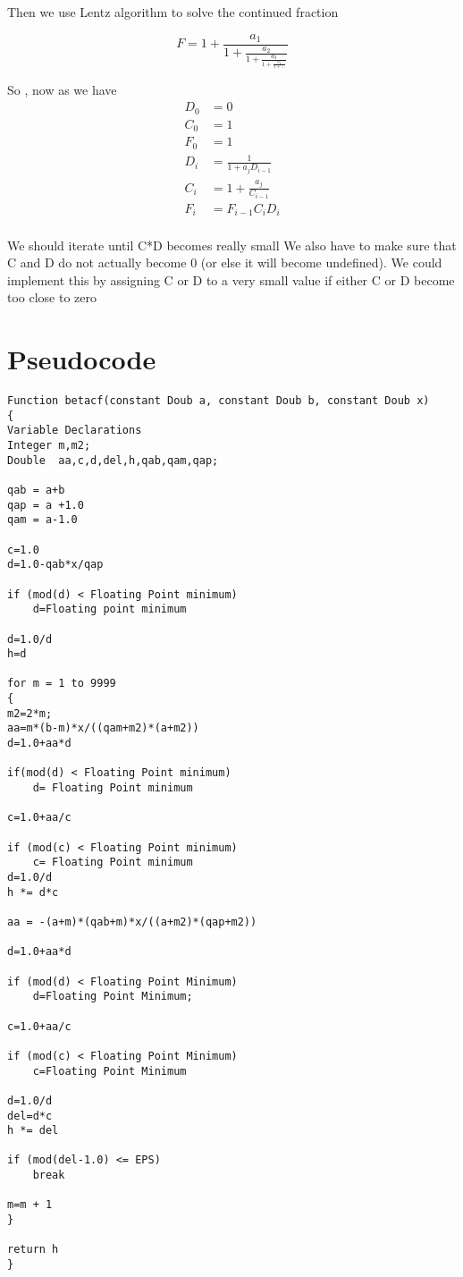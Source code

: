 \documentclass[12pt,letterpaper]{article}
\begin{document}
Then we use Lentz algorithm to solve the continued fraction


$$F = 1+\frac{a_1}{1+\frac{a_2}{1+\frac{a_3}{1+\frac{a_4}{1+...}}}}$$


So , now as we have
\begin{align*}

D_0 &= 0 \\
C_0 &= 1 \\
F_0 &= 1 \\

D_i &= \frac{1}{1 + a_j D_{i-1}} \\
C_i &= 1 + \frac{a_j}{C_{i-1}} \\
F_i &= F_{i-1} C_i D_i \\

\end{align*}

We should iterate until C*D becomes really small
We also have to make sure that C and D do not actually become 0 (or else it will become undefined). We could implement this by assigning C or D to a very small value if either C or D become too close to zero

\section*{Pseudocode}

     \begin{lstlisting}[style = C]
Function betacf(constant Doub a, constant Doub b, constant Doub x) 
{
Variable Declarations
Integer m,m2;
Double  aa,c,d,del,h,qab,qam,qap;

qab = a+b
qap = a +1.0
qam = a-1.0

c=1.0 
d=1.0-qab*x/qap

if (mod(d) < Floating Point minimum) 
    d=Floating point minimum

d=1.0/d
h=d

for m = 1 to 9999 
{
m2=2*m;
aa=m*(b-m)*x/((qam+m2)*(a+m2))
d=1.0+aa*d

if(mod(d) < Floating Point minimum) 
    d= Floating Point minimum 

c=1.0+aa/c

if (mod(c) < Floating Point minimum) 
    c= Floating Point minimum
d=1.0/d
h *= d*c

aa = -(a+m)*(qab+m)*x/((a+m2)*(qap+m2))

d=1.0+aa*d

if (mod(d) < Floating Point Minimum) 
    d=Floating Point Minimum;

c=1.0+aa/c

if (mod(c) < Floating Point Minimum) 
    c=Floating Point Minimum
    
d=1.0/d
del=d*c
h *= del

if (mod(del-1.0) <= EPS) 
    break

m=m + 1
}

return h
}

    \end{lstlisting}
\end{document}
